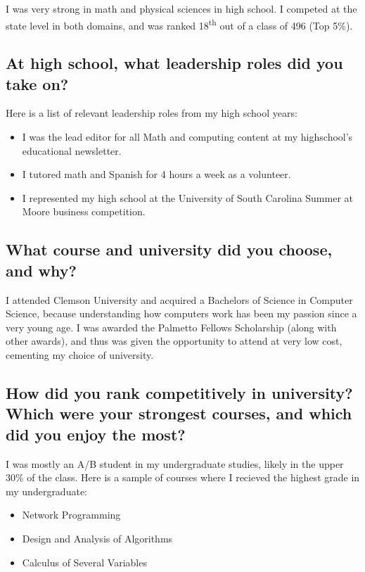 \documentclass{article}
\begin{document}
I was very strong in math and physical sciences in high school. I competed at the state level
in both domains, and was ranked 18\textsuperscript{th} out of a class of 496 (Top 5\%).

\subsection{At high school, what leadership roles did you take on?}

Here is a list of relevant leadership roles from my high school years:
\begin{itemize}
    \item I was the lead editor for all Math and computing content at my highschool's educational newsletter.
    \item I tutored math and Spanish for 4 hours a week as a volunteer.
    \item I represented my high school at the University of South Carolina Summer at Moore business competition.
\end{itemize}
\subsection{What course and university did you choose, and why?}

I attended Clemson University and acquired a Bachelors of Science in Computer
Science, because understanding how computers work has been my passion since a
very young age. I was awarded the Palmetto Fellows Scholarship (along with other
awards), and thus was given the opportunity to attend at very low cost, cementing
my choice of university.

\subsection{How did you rank competitively in university? Which were your
    strongest courses, and which did you enjoy the most?}

I was mostly an A/B student in my undergraduate studies, likely in the upper
30\% of the class. Here is a sample of courses where I recieved the highest
grade in my undergraduate:
\begin{itemize}
    \item Network Programming
    \item Design and Analysis of Algorithms
    \item Calculus of Several Variables
\end{itemize}
\end{document}
